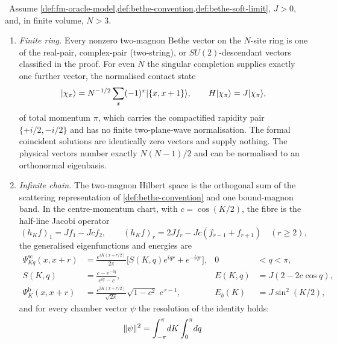 \begin{theorem}
\label{thm:two-magnon-completeness}
\statusProved\ Assume \cref{def:fm-oracle-model,def:bethe-convention,def:bethe-soft-limit},
$J>0$, and, in finite volume, $N>3$.
\begin{enumerate}
\item \emph{Finite ring.} Every nonzero two-magnon Bethe vector on the
  $N$-site ring is one of the real-pair, complex-pair (two-string), or
  $SU(2)$-descendant vectors classified in the proof. For even $N$ the
  singular completion supplies exactly one further vector, the normalised
  contact state
  \begin{equation}
    |\chi_\pi\rangle=N^{-1/2}\sum_x(-1)^x|\{x,x+1\}\rangle,
    \qquad H|\chi_\pi\rangle=J|\chi_\pi\rangle,
    \label{eq:singular-vector}
  \end{equation}
  of total momentum $\pi$, which carries the compactified rapidity pair
  $\{+i/2,-i/2\}$ and has no finite two-plane-wave normalisation. The formal
  coincident solutions are identically zero vectors and supply nothing. The
  physical vectors number exactly $N(N-1)/2$ and can be normalised to an
  orthonormal eigenbasis.
\item \emph{Infinite chain.} The two-magnon Hilbert space is the orthogonal
  sum of the scattering representation of \cref{def:bethe-convention} and one
  bound-magnon band. In the centre-momentum chart, with $c=\cos(K/2)$, the
  fibre is the half-line Jacobi operator
  \begin{equation}
    (h_Kf)_1=Jf_1-Jcf_2,\qquad
    (h_Kf)_r=2Jf_r-Jc(f_{r-1}+f_{r+1})\quad(r\ge2),
    \label{eq:jacobi-fibre}
  \end{equation}
  the generalised eigenfunctions and energies are
  \begin{align}
    \Psi^{\mathrm{sc}}_{Kq}(x,x+r)
      &=\frac{e^{iK(x+r/2)}}{2\pi}\bigl[S(K,q)e^{iqr}+e^{-iqr}\bigr],
      & 0&<q<\pi, \label{eq:psi-sc}\\
    S(K,q)&=\frac{c-e^{-iq}}{e^{iq}-c},
      & E(K,q)&=J(2-2c\cos q), \label{eq:S-fibre}\\
    \Psi^{\mathrm{b}}_{K}(x,x+r)
      &=\frac{e^{iK(x+r/2)}}{\sqrt{2\pi}}\sqrt{1-c^2}\;c^{\,r-1},
      & E_b(K)&=J\sin^2(K/2), \label{eq:psi-b}
  \end{align}
  and for every chamber vector $\psi$ the resolution of the identity holds:
  \begin{equation}
    \norm{\psi}^2
    =\int_{-\pi}^{\pi}\!dK\int_0^\pi\!dq\;

\end{equation}
\end{enumerate}
\end{theorem}

